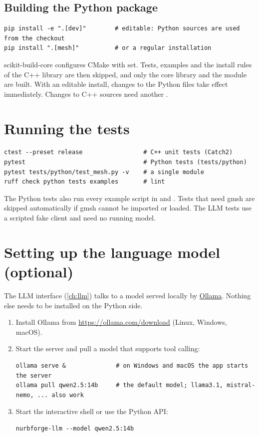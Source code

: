 \subsection{Building the Python package}\label{sec:install-python-src}

\begin{lstlisting}[style=shell]
pip install -e ".[dev]"        # editable: Python sources are used from the checkout
pip install ".[mesh]"          # or a regular installation
\end{lstlisting}

scikit-build-core configures CMake with  set. Tests, examples and the install rules
of the C++ library are then skipped, and only the core library and the module  are
built. With an editable install, changes to the Python files take effect immediately. Changes
to C++ sources need another .

\section{Running the tests}\label{sec:install-tests}

\begin{lstlisting}[style=shell]
ctest --preset release                 # C++ unit tests (Catch2)
pytest                                 # Python tests (tests/python)
pytest tests/python/test_mesh.py -v    # a single module
ruff check python tests examples       # lint
\end{lstlisting}

The Python tests also run every example script in  and
. Tests that need gmsh are skipped automatically if gmsh cannot be
imported or loaded. The LLM tests use a scripted fake client and need no running model.

\section{Setting up the language model (optional)}\label{sec:install-ollama}

The LLM interface (\cref{ch:llm}) talks to a model served locally by
\href{https://ollama.com}{Ollama}. Nothing else needs to be installed on the Python side.

\begin{enumerate}
  \item Install Ollama from \url{https://ollama.com/download} (Linux, Windows, macOS).
  \item Start the server and pull a model that supports tool calling:
\begin{lstlisting}[style=shell]
ollama serve &              # on Windows and macOS the app starts the server
ollama pull qwen2.5:14b     # the default model; llama3.1, mistral-nemo, ... also work
\end{lstlisting}
  \item Start the interactive shell or use the Python API:
\begin{lstlisting}[style=shell]
nurbforge-llm --model qwen2.5:14b
\end{lstlisting}
\end{enumerate}

